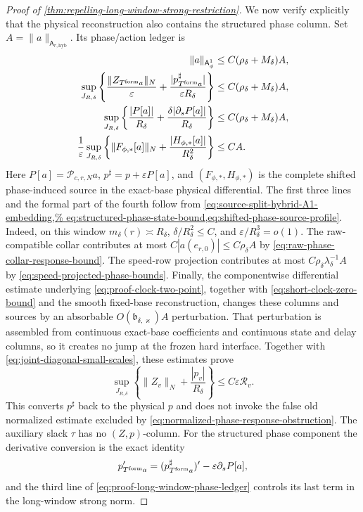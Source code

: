 \begin{proof}[Proof of
\cref{thm:repelling-long-window-strong-restriction}]
We now verify explicitly that the physical reconstruction also contains the
structured phase column.  Set
\(A=\|a\|_{\mathsf A_{r,\mathrm{hyb}}}\).  Its phase/action ledger is
\begin{align}
 \|a\|_{\mathsf A_\phi^1}
 &\le C(\rho_\delta+M_\delta)A,\notag\\
 \sup_{J_{R,\delta}}
  \left\{\frac{\|Z_{T^{\rm form}a}\|_N}{\varepsilon}
       +\frac{|p_{T^{\rm form}a}^{\sharp}|}
                    {\varepsilon R_\delta}\right\}
 &\le C(\rho_\delta+M_\delta)A,\notag\\
 \sup_{J_{R,\delta}}
  \left\{\frac{|P[a]|}{R_\delta}
       +\frac{\delta|\partial_sP[a]|}{R_\delta}\right\}
 &\le C(\rho_\delta+M_\delta)A,\notag\\
 \frac1\varepsilon\sup_{J_{R,\delta}}
  \left\{\|F_{\phi,*}[a]\|_N
       +\frac{|H_{\phi,*}[a]|}{R_\delta^2}\right\}
 &\le CA.                                      \label{eq:proof-long-window-phase-ledger}
\end{align}
Here \(P[a]=\mathscr P_{c,r,N}a\),
\(p^\sharp=p+\varepsilon P[a]\), and
\((F_{\phi,*},H_{\phi,*})\) is the complete shifted phase-induced source
in the exact-base physical differential.  The first three lines and the
formal part of the fourth follow from
\cref{eq:source-split-hybrid-A1-embedding,%
eq:structured-phase-state-bound,eq:shifted-phase-source-profile}.  Indeed,
on this window \(m_\delta(r)\asymp R_\delta\),
\(\delta/R_\delta^2\le C\), and
\(\varepsilon/R_\delta^3=o(1)\).  The raw-compatible collar contributes at
most \(C|a(e_{r,0})|\le C\rho_\delta A\) by
\cref{eq:raw-phase-collar-response-bound}.  The speed-row projection
contributes at most
\(C\rho_\delta\lambda_\delta^{-1}A\) by
\cref{eq:speed-projected-phase-bounds}.  Finally,
the componentwise differential estimate underlying
\cref{eq:proof-clock-two-point}, together with
\cref{eq:short-clock-zero-bound} and the smooth fixed-base reconstruction,
changes these columns and sources by an absorbable
\(O(\mathfrak b_{\delta,\varkappa})A\) perturbation.  That perturbation is
assembled from continuous exact-base coefficients and continuous state and
delay columns, so it creates no jump at the frozen hard interface.  Together with
\cref{eq:joint-diagonal-small-scales}, these estimates prove
\begin{equation}
 \sup_{J_{R,\delta}}
  \left\{\|Z_v\|_N+\frac{|p_v|}{R_\delta}\right\}
 \le C\varepsilon\mathcal R_v.                  \label{eq:proof-long-window-state-bound}
\end{equation}
This converts \(p^\sharp\) back to the physical \(p\) and does not invoke
the false old normalized estimate excluded by
\cref{eq:normalized-phase-response-obstruction}.  The auxiliary slack
\(\tau\) has no \((Z,p)\)-column.
For the structured phase component the derivative conversion is the exact
identity
\begin{equation}
 p_{T^{\rm form}a}'=(p_{T^{\rm form}a}^{\sharp})'
       -\varepsilon\partial_sP[a],               \label{eq:proof-long-window-phase-derivative-shift}
\end{equation}
and the third line of \cref{eq:proof-long-window-phase-ledger} controls its
last term in the long-window strong norm.


\end{proof}

